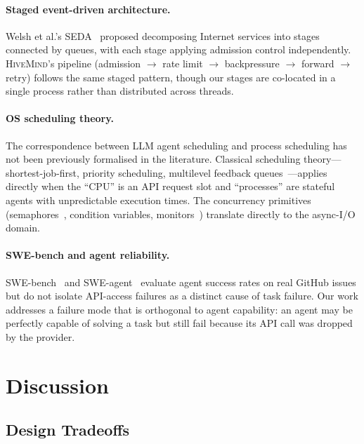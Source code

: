 \documentclass[11pt,twocolumn]{article}
\newcommand{\hm}{\textsc{HiveMind}}
\begin{document}
\paragraph{Staged event-driven architecture.}
Welsh et al.'s SEDA~\cite{welsh2001seda} proposed decomposing
Internet services into stages connected by queues, with each
stage applying admission control independently.  \hm{}'s
pipeline (admission $\to$ rate limit $\to$ backpressure $\to$
forward $\to$ retry) follows the same staged pattern, though
our stages are co-located in a single process rather than
distributed across threads.

\paragraph{OS scheduling theory.}
The correspondence between LLM agent scheduling and process
scheduling has not been previously formalised in the literature.
Classical scheduling theory---shortest-job-first, priority
scheduling, multilevel feedback
queues~\cite{silberschatz2018os,tanenbaum2015os}---applies
directly when the ``CPU'' is an API request slot and
``processes'' are stateful agents with unpredictable execution
times.  The concurrency primitives
(semaphores~\cite{dijkstra1965cooperating}, condition variables,
monitors~\cite{herlihy2012art}) translate directly to the
async-I/O domain.

\paragraph{SWE-bench and agent reliability.}
SWE-bench~\cite{jimenez2024swebench} and
SWE-agent~\cite{yang2024sweagent} evaluate agent success rates
on real GitHub issues but do not isolate API-access failures as
a distinct cause of task failure.  Our work addresses a failure
mode that is orthogonal to agent capability: an agent may be
perfectly capable of solving a task but still fail because its
API call was dropped by the provider.

\section{Discussion}
\label{sec:discussion}

\subsection{Design Tradeoffs}
\end{document}
